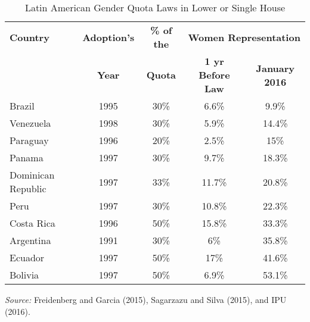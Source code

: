 \documentclass[12pt,a4paper]{article}
\begin{document}
\begin{table}[htbp!]
\centering
\caption{Latin American Gender Quota Laws in Lower or Single House \label{LAquotas}}
\begin{tabular}{lcccc} \hline\hline
\textbf{Country} & \textbf{Adoption's} & \textbf{\% of the} & \multicolumn{2}{c}{\textbf{Women Representation}}\\
 & \textbf{Year} & \textbf{Quota} & \textbf{1 yr Before Law} & \textbf{January 2016}\\
\hline
	Brazil & 1995 & 30\% & 6.6\% & 9.9\% \\ 
	Venezuela & 1998 & 30\% & 5.9\% & 14.4\% \\ 
	Paraguay & 1996 & 20\% & 2.5\% & 15\% \\
	Panama & 1997 & 30\% & 9.7\% & 18.3\% \\ 
    Dominican Republic & 1997 & 33\% & 11.7\% & 20.8\% \\ 
	Peru & 1997 & 30\% & 10.8\% & 22.3\% \\
	Costa Rica & 1996 & 50\% & 15.8\% & 33.3\% \\ 
	Argentina & 1991 & 30\% & 6\% & 35.8\% \\
	Ecuador & 1997 & 50\% & 17\% & 41.6\% \\ 
	Bolivia & 1997 & 50\% & 6.9\% & 53.1\% \\ 
	\hline
\end{tabular}
\begin{flushleft} 
\scriptsize\emph{Source:} {Freidenberg and Garcia (2015), Sagarzazu and Silva (2015), and IPU (2016).}
\end{flushleft}
\end{table}

\end{document}
